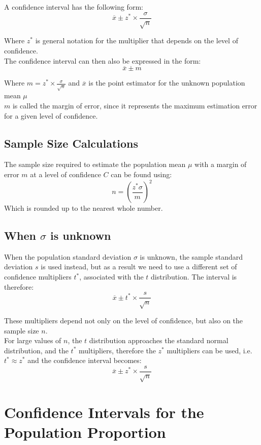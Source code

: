 \documentclass[12pt letter]{report}
\begin{document}
A confidence interval has the following form:
\[
  \overline{x} \pm z^{*} \times \frac{\sigma }{\sqrt{n}}
\]

Where $z^*$ is general notation for the multiplier that depends on the level of confidence. \\
The confidence interval can then also be expressed in the form:
\[
  \overline{x} \pm m
\]

Where $m = z^* \times \frac{\sigma}{\sqrt{n}}$ and $\overline{x}$ is the point estimator for the unknown population mean $\mu $\\
$m$ is called the margin of error, since it represents the maximum estimation error for a given level of confidence.


\subsection{Sample Size Calculations}

The sample size required to estimate the population mean $\mu $ with a margin of error $m$ at a level of confidence $C$ can be found using:
\[
  n = \left( \frac{z^*  \sigma }{m} \right)^2
\]
Which is rounded up to the nearest whole number.

\subsection{When $\sigma $ is unknown}

When the population standard deviation $\sigma $ is unknown, the sample standard deviation $s$ is used instead, but as a
result we need to use a different set of confidence multipliers $t^*$, associated with the $t$ distribution. The
interval is therefore:
\[
  \overline{x} \pm t^* \times \frac{s}{\sqrt{n}}
\]

These multipliers depend not only on the level of confidence, but also on the sample size $n$. \\
For large values of $n$, the $t$ distribution approaches the standard normal distribution, and the $t^*$ multipliers,
therefore the $z^*$ multipliers can be used, i.e. $t^* \approx z^*$ and the confidence interval becomes:
\[
  \overline{x} \pm z^* \times \frac{s}{\sqrt{n}}
\]


\section{Confidence Intervals for the Population Proportion}
\end{document}
